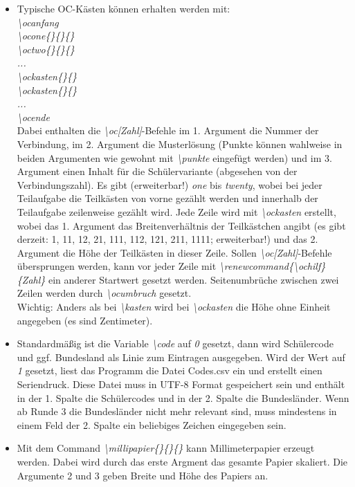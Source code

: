 \documentclass[./main.tex]{subfiles}
\begin{document}
\begin{itemize}
    \item Typische OC-K\"asten k\"onnen erhalten werden mit: \\
    \textit{\textbackslash ocanfang \\\textbackslash ocone\{\}\{\}\{\} \\\textbackslash octwo\{\}\{\}\{\} \\...\\\textbackslash ockasten\{\}\{\}\\\textbackslash ockasten\{\}\{\}\\...\\\textbackslash ocende}\\
    Dabei enthalten die \textit{\textbackslash oc[Zahl]}-Befehle im 1. Argument die Nummer der Verbindung, im 2. Argument die Musterl\"osung (Punkte k\"onnen wahlweise in beiden Argumenten wie gewohnt mit \textit{\textbackslash punkte} eingef\"ugt werden) und im 3. Argument einen Inhalt f\"ur die Sch\"ulervariante (abgesehen von der Verbindungszahl). Es gibt (erweiterbar!) \textit{one} bis \textit{twenty}, wobei bei jeder Teilaufgabe die Teilk\"asten von vorne gez\"ahlt werden und innerhalb der Teilaufgabe zeilenweise gez\"ahlt wird. Jede Zeile wird mit \textit{\textbackslash ockasten} erstellt, wobei das 1. Argument das Breitenverh\"altnis der Teilk\"astchen angibt (es gibt derzeit: 1, 11, 12, 21, 111, 112, 121, 211, 1111; erweiterbar!) und das 2. Argument die H\"ohe der Teilk\"asten in dieser Zeile. Sollen \textit{\textbackslash oc[Zahl]}-Befehle \"ubersprungen werden, kann vor jeder Zeile mit \textit{\textbackslash renewcommand\{\textbackslash ochilf\}\{Zahl\}} ein anderer Startwert gesetzt werden. Seitenumbr\"uche zwischen zwei Zeilen werden durch \textit{\textbackslash ocumbruch} gesetzt. \\Wichtig: Anders als bei \textit{\textbackslash kasten} wird bei \textit{\textbackslash ockasten} die H\"ohe ohne Einheit angegeben (es sind Zentimeter). 
    \item Standardm\"a\ss{}ig ist die Variable \textit{\textbackslash code} auf \textit{0} gesetzt, dann wird Sch\"ulercode und ggf. Bundesland als Linie zum Eintragen ausgegeben. Wird der Wert auf \textit{1} gesetzt, liest das Programm die Datei Codes.csv ein und erstellt einen Seriendruck. Diese Datei muss in UTF-8 Format gespeichert sein und enth\"alt in der 1. Spalte die Sch\"ulercodes und in der 2. Spalte die Bundesl\"ander. Wenn ab Runde 3 die Bundesl\"ander nicht mehr relevant sind, muss mindestens in einem Feld der 2. Spalte ein beliebiges Zeichen eingegeben sein.
    \item Mit dem Command \textit{\textbackslash millipapier\{\}\{\}\{\}} kann Millimeterpapier erzeugt werden. Dabei wird durch das erste Argment das gesamte Papier skaliert. Die Argumente 2 und 3 geben Breite und Höhe des Papiers an.
\end{itemize}
\end{document}
